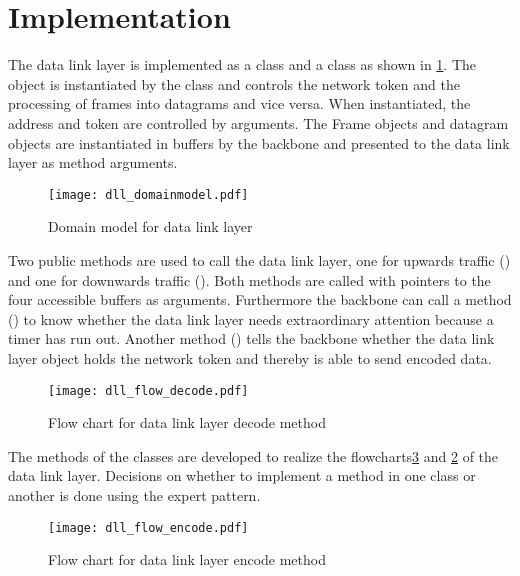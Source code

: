 \section{Implementation}
The data link layer is implemented as a  class and a
 class as shown in \ref{fig:class_diag_for_datalink}. The
 object is instantiated by the  class and
controls the network token and the processing of frames into datagrams and vice
versa. When instantiated, the address and token are controlled by arguments. The
Frame objects and datagram objects are instantiated in buffers by the backbone
and presented to the data link layer as method arguments.

\begin{figure}[htb]
	\begin{center}
	\texttt{[image: dll\_domainmodel.pdf]}
	\caption{Domain model for data link layer}
	\label{fig:class_diag_for_datalink}	
	\end{center}
\end{figure}

Two public methods are used to call the data link layer, one for upwards traffic
() and one for downwards traffic (). Both methods are called with
pointers to the four accessible buffers as arguments. Furthermore the backbone
can call a method () to know whether the data link layer needs
extraordinary attention because a timer has run out. Another method
() tells the backbone whether the data link layer object holds the
network token and thereby is able to send encoded data.

\begin{figure}[htb]
	\begin{center}
	\texttt{[image: dll\_flow\_decode.pdf]}
	\caption{Flow chart for data link layer decode method}
	\label{fig:dll_flow_decode}	
	\end{center}
\end{figure}

The methods of the classes are developed to realize the
flowcharts\ref{fig:dll_flow_encode} and
\ref{fig:dll_flow_decode} of the data link layer. Decisions on whether to implement a method in one class or another is done using the expert pattern.

\begin{figure}[htb]
	\begin{center}
	\texttt{[image: dll\_flow\_encode.pdf]}
	\caption{Flow chart for data link layer encode method}
	\label{fig:dll_flow_encode}	
	\end{center}
\end{figure}

